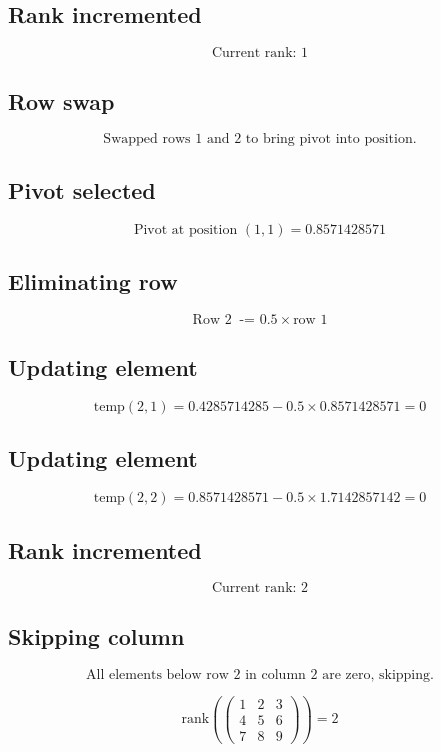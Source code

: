\documentclass{article}
\begin{document}
\subsection*{ \vspace{1em} Rank incremented}
\[
\text{Current rank: } 1
\]
\subsection*{ \vspace{1em} Row swap}
\[
\text{Swapped rows } 1 \text{ and } 2 \text{ to bring pivot into position.}
\]
\subsection*{ \vspace{1em} Pivot selected}
\[
\text{Pivot at position } ( 1,1 ) = 0.8571428571
\]
\subsection*{ \vspace{1em} Eliminating row}
\[
\text{Row } 2\ \text{ -= } 0.5 \times \text{row } 1
\]
\subsection*{ \vspace{1em} Updating element}
\[
\text{temp}( 2,1 ) = 0.4285714285 - 0.5 \times 0.8571428571 = 0
\]
\subsection*{ \vspace{1em} Updating element}
\[
\text{temp}( 2,2 ) = 0.8571428571 - 0.5 \times 1.7142857142 = 0
\]
\subsection*{ \vspace{1em} Rank incremented}
\[
\text{Current rank: } 2
\]
\subsection*{ \vspace{1em} Skipping column}
\[
\text{All elements below row } 2 \text{ in column } 2 \text{ are zero, skipping.}
\]
\medskip

\[
\text{rank}(\begin{pmatrix}1 & 2 & 3 \\ 4 & 5 & 6 \\ 7 & 8 & 9\end{pmatrix}) = 2
\]
\bigskip

\hrulefill
\bigskip
\end{document}
